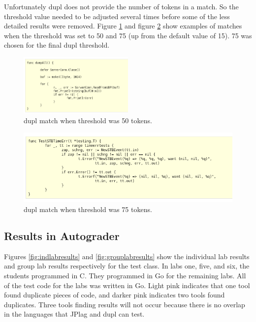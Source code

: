 \documentclass[10pt,journal,compsoc]{IEEEtran}
\begin{document}
		Unfortunately dupl does not provide the number of tokens in a match. So the threshold value needed to be adjusted several times before some of the less detailed results were removed. Figure \ref{fig:dupl50} and figure \ref{fig:dupl75} show examples of matches when the threshold was set to 50 and 75 (up from the default value of 15). 75 was chosen for the final dupl threshold.
		
		\begin{figure}[h!]
			\includegraphics[width=0.5\textwidth]{dupl50.png}
			\caption{dupl match when threshold was 50 tokens.}
			\label{fig:dupl50}
		\end{figure}
		
		\begin{figure}[h!]
			\includegraphics[width=1.0\textwidth]{dupl75.png}
			\caption{dupl match when threshold was 75 tokens.}
			\label{fig:dupl75}
		\end{figure}
		
		\subsection{Results in Autograder}
		
		Figures \ref{fig:indlabresults} and \ref{fig:grouplabresults} show the individual lab results and group lab results respectively for the test class. In labs one, five, and six, the students programmed in C. They programmed in Go for the remaining labs. All of the test code for the labs was written in Go.  Light pink indicates that one tool found duplicate pieces of code, and darker pink indicates two tools found duplicates. Three tools finding results will not occur because there is no overlap in the languages that JPlag and dupl can test.
		
\end{document}

